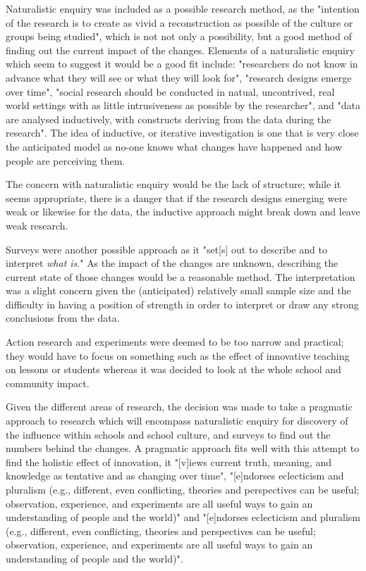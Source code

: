 Naturalistic enquiry was included as a possible research method, as the "intention of the research is to create as vivid a reconstruction as possible of the culture or groups being studied", \cite{Cohen2005} which is not not only a possibility, but a good method of finding out the current impact of the changes. Elements of a naturalistic enquiry which seem to suggest it would be a good fit include: "researchers do not know in advance what they will see or what they will look for", "research designs emerge over time", "social research should be conducted in natual, uncontrived, real world settings with as little intrusiveness as possible by the researcher", and "data are analysed inductively, with constructs deriving from the data during the research". The idea of inductive, or iterative investigation is one that is very close the anticipated model as no-one knows what changes have happened and how people are perceiving them. 

The concern with naturalistic enquiry would be the lack of structure; while it seems appropriate, there is a danger that if the research designs emerging were weak or likewise for the data, the inductive approach might break down and leave weak research.

Surveys were another possible approach as it "set[s] out to describe and to interpret \textit{what is}." \cite[p. 169]{Cohen2005} As the impact of the changes are unknown, describing the current state of those changes would be a reasonable method. The interpretation was a slight concern given the (anticipated) relatively small sample size and the difficulty in having a position of strength in order to interpret or draw any strong conclusions from the data.

Action research and experiments were deemed to be too narrow and practical; they would have to focus on something such as the effect of innovative teaching on lessons or students whereas it was decided to look at the whole school and community impact.

Given the different areas of research, the decision was made to take a pragmatic approach to research which will encompass naturalistic enquiry for discovery of the influence within schools and school culture, and surveys to find out the numbers behind the changes.  A pragmatic approach fits well with this attempt to find the holistic effect of innovation, it "[v]iews current truth, meaning, and knowledge as tentative and as changing over time",  \cite[p. 18]{Johnson_2004} "[e]ndorses eclecticism and pluralism (e.g., different, even conflicting, theories and perspectives can be useful; observation, experience, and experiments are all useful ways to gain an understanding of people and the world)"  and "[e]ndorses eclecticism and pluralism (e.g., different, even conflicting, theories and perspectives can be useful; observation, experience, and experiments are all useful ways to gain an understanding of people and the world)".

